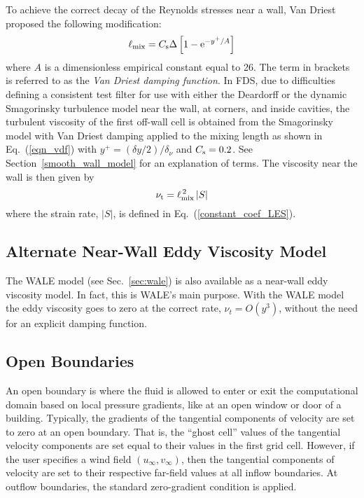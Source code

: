 To achieve the correct decay of the Reynolds stresses near a wall, Van Driest~\cite{Wilcox:1} proposed the following modification:
\begin{equation}
\label{eqn_vdf}
\ell_{\rm mix} = C_{\rm s} \Delta \left[ 1 - \mathrm{e}^{-y^+/A} \right]
\end{equation}
where $A$ is a dimensionless empirical constant equal to 26.  The term in brackets is referred to as the {\em Van Driest damping function}. In FDS, due to difficulties defining a consistent test filter for use with either the Deardorff or the dynamic Smagorinsky turbulence model near the wall, at corners, and inside cavities, the turbulent viscosity of the first off-wall cell is obtained from the Smagorinsky model with Van Driest damping applied to the mixing length as shown in Eq.~(\ref{eqn_vdf}) with $y^+ = (\delta y/2)/\delta_\nu$ and $C_{\rm s} = 0.2$.  See Section~\ref{smooth_wall_model} for an explanation of terms. The viscosity near the wall is then given by
\begin{equation}
   \nu_{\rm t} = \ell_{\rm mix}^{\,2}\,|S|  \label{eqn_nearwall_viscosity}
\end{equation}
where the strain rate, $|S|$, is defined in Eq.~(\ref{constant_coef_LES}).

\subsection{Alternate Near-Wall Eddy Viscosity Model}
\label{sec:wall_wale_model}

The WALE model (see Sec.~\ref{sec:wale}) is also available as a near-wall eddy viscosity model.  In fact, this is WALE's main purpose.  With the WALE model the eddy viscosity goes to zero at the correct rate, $\nu_t = O(y^3)$, without the need for an explicit damping function.

\subsection{Open Boundaries}

An open boundary is where the fluid is allowed to enter or exit the computational domain based on local pressure gradients, like at an open window or door of a building. Typically, the gradients of the tangential components of velocity are set to zero at an open boundary. That is, the ``ghost cell'' values of the tangential velocity components are set equal to their values in the first grid cell. However, if the user specifies a wind field $(u_\infty,v_\infty)$, then the tangential components of velocity are set to their respective far-field values at all inflow boundaries. At outflow boundaries, the standard zero-gradient condition is applied.

